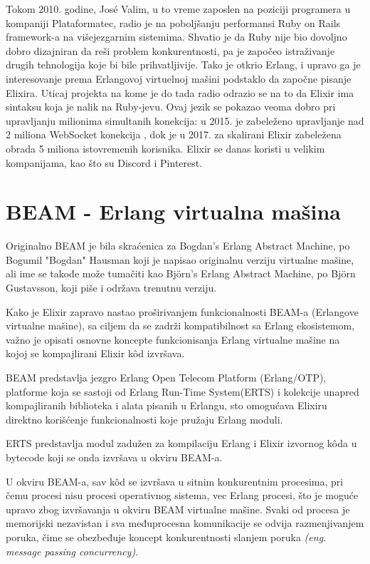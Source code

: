 \documentclass[a4paper]{article}
\begin{document}
Tokom 2010. godine, José Valim, u to vreme zaposlen na poziciji programera u kompaniji Plataformatec, radio je na poboljšanju performansi Ruby on Rails framework-a na višejezgarnim sistemima. \cite{sitePlataformatec} Shvatio je da Ruby nije bio dovoljno dobro dizajniran da reši problem konkurentnosti, pa je započeo istraživanje drugih tehnologija koje bi bile prihvatljivije. Tako je otkrio Erlang, i upravo ga je interesovanje prema Erlangovoj virtuelnoj mašini podstaklo da započne pisanje Elixira. Uticaj projekta na kome je do tada radio odrazio se na to da Elixir ima sintaksu koja je nalik na Ruby-jevu. Ovaj jezik se pokazao veoma dobro pri upravljanju milionima simultanih konekcija: u 2015. je zabeleženo upravljanje nad 2 miliona WebSocket konekcija \cite{sitePhoenix}, dok je u 2017. za skalirani Elixir zabeležena obrada 5 miliona istovremenih korisnika. Elixir se danas koristi u velikim kompanijama, kao što su Discord \cite{siteDiscord} i Pinterest\cite{sitePinterest}.

\section{BEAM - Erlang virtualna mašina}

Originalno BEAM je bila skraćenica za Bogdan's Erlang Abstract Machine, po Bogumil "Bogdan" Hausman koji je napisao originalnu verziju virtualne mašine, ali ime se takođe može tumačiti kao Björn's Erlang Abstract Machine, po Björn Gustavsson, koji piše i održava trenutnu verziju.

Kako je Elixir zapravo nastao proširivanjem funkcionalnosti BEAM-a (Erlangove virtualne mašine), sa ciljem da se zadrži kompatibilnost sa Erlang ekosistemom, važno je opisati osnovne koncepte funkcionisanja Erlang virtualne mašine na kojoj se kompajlirani Elixir kôd izvršava.

BEAM predstavlja jezgro Erlang Open Telecom Platform (Erlang/OTP), platforme koja se sastoji od Erlang Run-Time System(ERTS) i  kolekcije unapred kompajliranih biblioteka i alata pisanih u Erlangu, sto omogućava Elixiru direktno korišćenje funkcionalnosti koje pružaju Erlang moduli.

ERTS predstavlja modul zadužen za kompilaciju Erlang i Elixir izvornog kôda u bytecode koji se onda izvršava u okviru BEAM-a.

U okviru BEAM-a, sav kôd se izvršava u sitnim konkurentnim procesima, pri čemu procesi nisu procesi operativnog sistema, vec Erlang procesi, što je moguće upravo zbog izvršavanja u okviru BEAM virtualne mašine. Svaki od procesa je memorijski nezavistan i sva međuprocesna komunikacije se odvija razmenjivanjem poruka, čime se obezbeđuje koncept konkurentnosti slanjem poruka \textit{(eng. message passing concurrency)}.\cite{knjigaElixir} 
\end{document}
